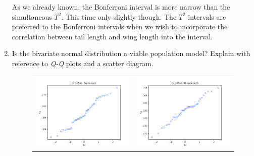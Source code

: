 \begin{enumerate}[label= (\alph*)]
    As we already known, the Bonferroni interval is more narrow than the simultaneous $T^{2}$. This time only slightly though. The $T^{2}$ intervals are preferred to the Bonferroni intervals when we wish to incorporate the correlation between tail length and wing length into the interval.

    \item Is the bivariate normal distribution a viable population model? Explain with reference to \textit{Q-Q} plots and a scatter diagram.
    
    \begin{figure}[H]
        \centering
        \begin{tabular}{cc}
            \includegraphics[scale=0.30]{./python/chapter-5/Question-5-20-c-QQ-TailLen.png} &
            \includegraphics[scale=0.30]{./python/chapter-5/Question-5-20-c-QQ-Winglen.png}
        \end{tabular}
    \end{figure}


\end{enumerate}
